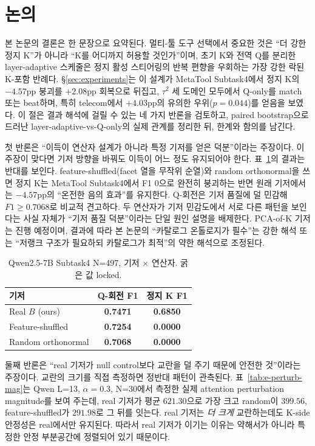 \section{논의}\label{sec:discussion}

본 논문의 결론은 한 문장으로 요약된다. 멀티-툴 도구 선택에서 중요한 것은 ``더 강한 정지 K''가 아니라 ``K를 어디까지 허용할 것인가''이며, 초기 K와 전역 Q를 분리한 layer-adaptive 스케줄은 정지 활성 스티어링의 반복 편향을 우회하는 가장 강한 락된 K-포함 반례다. \S\ref{sec:experiments}는 이 설계가 MetaTool Subtask4에서 정지 K의 $-4.57$pp 붕괴를 $+2.08$pp 회복으로 뒤집고, $\tau^2$ 세 도메인 모두에서 Q-only를 match 또는 beat하며, 특히 telecom에서 $+4.03$pp의 유의한 우위($p=0.044$)를 얻음을 보였다. 이 절은 결과 해석에 걸릴 수 있는 네 가지 반론을 검토하고, paired bootstrap으로 드러난 layer-adaptive-vs-Q-only의 실제 관계를 정리한 뒤, 한계와 함의를 남긴다.

첫 반론은 ``이득이 연산자 설계가 아니라 특정 기저를 얻은 덕분''이라는 주장이다. 이 주장이 맞다면 기저 방향을 바꿔도 이득이 어느 정도 유지되어야 한다. 표~\ref{tab:e4-basis}의 결과는 반대를 보인다. feature-shuffled(facet 열을 무작위 순열)와 random orthonormal을 쓰면 정지 K는 MetaTool Subtask4에서 F1 0으로 완전히 붕괴하는 반면 원래 기저에서는 $-4.57$pp의 ``온전한 음의 효과''를 유지한다. Q-회전은 기저 품질에 덜 민감해 $F1 \ge 0.7068$로 비교적 견고하다. 두 연산자가 기저 민감도에서 서로 다른 패턴을 보인다는 사실 자체가 ``기저 품질 덕분''이라는 단일 원인 설명을 배제한다. PCA-of-K 기저는 진행 예정이며, 결과에 따라 본 논문의 ``카탈로그 온톨로지가 필수''는 강한 해석 또는 ``저랭크 구조가 필요하되 카탈로그가 최적''의 약한 해석으로 조정된다.

\begin{table}[t]
\centering
\caption{Qwen2.5-7B Subtask4 N=497, 기저 $\times$ 연산자. 굵은 값 locked.}
\label{tab:e4-basis}
\small
\begin{tabularx}{0.9\linewidth}{@{}Xcc@{}}
\toprule
기저 & Q-회전 F1 & 정지 K F1 \\
\midrule
Real $B$ (ours) & \textbf{0.7471} & \textbf{0.6850} \\
Feature-shuffled & \textbf{0.7254} & \textbf{0.0000} \\
Random orthonormal & \textbf{0.7068} & \textbf{0.0000} \\
\bottomrule
\end{tabularx}
\end{table}

둘째 반론은 ``real 기저가 null control보다 교란을 덜 주기 때문에 안전한 것''이라는 주장이다. 교란의 크기를 직접 측정하면 정반대 패턴이 관측된다. 표~\ref{tab:e-perturb-mag}는 Qwen L=13, $\alpha=0.3$, N=30에서 측정한 실제 attention perturbation magnitude를 보여 주는데, real 기저가 평균 $621.30$으로 가장 크고 random이 $399.56$, feature-shuffled가 $291.98$로 그 뒤를 잇는다. real 기저는 \emph{더 크게} 교란하는데도 K-side 안정성은 real에서만 유지된다. 따라서 real 기저가 이기는 이유는 약해서가 아니라 특정한 안정 부분공간에 정렬되어 있기 때문이다.

